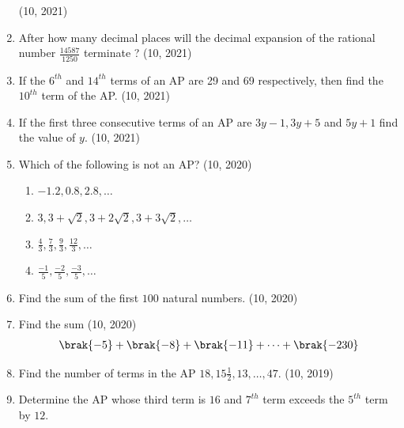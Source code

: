 \begin{enumerate}[label=\thesubsection.\arabic*,ref=\thesubsection.\theenumi,itemsep=1pt]
%
	\hfill (10, 2021) \item After how many decimal places will the decimal expansion of the rational number $\frac{14587}{1250}$ terminate ?			
\hfill (10, 2021)
	 \item If the $6^{th}$ and $14^{th}$ terms of an AP are 29 and 69 respectively, then find the $10^{th}$ term of the AP.
	\hfill (10, 2021) \item If the first three consecutive terms of an AP are $3y-1, 3y+5$ and $5y+1$ find the value of $y$. 
\hfill (10, 2021)
 \item Which of the following is not an AP? 
\hfill (10, 2020)
\begin{multicols}{2}
\begin{enumerate}    
               \item $-1.2,0.8,2.8,\dots$ 
	        \item $3,3+\sqrt2,3+2\sqrt2,3+3\sqrt2,\dots$ 
	        \item $\frac{4}{3},\frac{7}{3},\frac{9}{3},\frac{12}{3},\dots$ 
	        \item $\frac{-1}{5},\frac{-2}{5},\frac{-3}{5},\dots$ 
\end{enumerate}
\end{multicols}
 \item Find the sum of the first $100$ natural numbers.	
	\hfill (10, 2020)
 \item Find the sum
\hfill (10, 2020)
\begin{align*}
	\brak{-5} + \brak{-8} + \brak{-11} + \dots + \brak{-230}
\end{align*}
 \item Find the number of terms in the AP 
    $18,15\frac{1}{2},13, \dots, 47.$
\hfill (10, 2019) \item Determine the AP whose third term is $16$ and $7^{th}$ term exceeds the $5^{th}$ term by $12$.


\end{enumerate}
